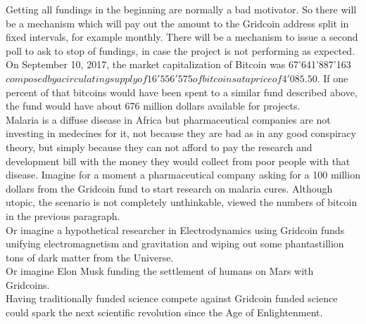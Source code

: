 Getting all fundings in the beginning are normally a bad motivator. So there will be a mechanism which will pay out the amount to the Gridcoin address split in fixed intervals, for example monthly. There will be a mechanism to issue a second poll to ask to stop of fundings, in case the project is not performing as expected.\\

On September 10, 2017, the market capitalization of Bitcoin was 67'641'887'163 $ composed by a circulating supply of 16'556'575 of bitcoins at a price of 4'085.50 $. If one percent of that bitcoins would have been spent to a similar fund described above, the fund would have about 676 million dollars available for projects.\\

Malaria is a diffuse disease in Africa but pharmaceutical companies are not investing in medecines for it, not because they are bad as in any good conspiracy theory, but simply because they can not afford to pay the research and development bill with the money they would collect from poor people with that disease. Imagine for a moment a pharmaceutical company asking for a 100 million dollars from the Gridcoin fund to start research on malaria cures. Although utopic, the scenario is not completely unthinkable, viewed the numbers of bitcoin in the previous paragraph.\\

Or imagine a hypothetical researcher in Electrodynamics using Gridcoin funds unifying electromagnetism and gravitation and wiping out some phantastillion tons of dark matter from the Universe.\\

Or imagine Elon Musk funding the settlement of humans on Mars with Gridcoins.\\

Having traditionally funded science compete against Gridcoin funded science could spark the next scientific revolution since the Age of Enlightenment.\\

